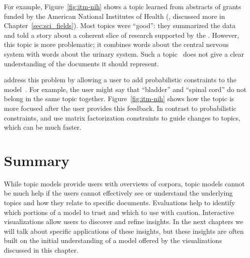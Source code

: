 For example, Figure~\ref{fig:itm-nih} shows a topic learned from abstracts of
grants funded by the American National Institutes of Health
(, discussed more in Chapter~\ref{sec:sci_fields}).  Most
topics were ``good'': they summarized the data and told a story about
a coherent slice of research supported by the .  However,
this topic is more problematic; it combines words about the central
nervous system with words about the urinary system.  Such a topic~\citep{mimno-11} does not give a clear understanding of the
documents it should represent.

\citet{hu-14:itm} address this problem by allowing a user to add probabilistic
constraints to the model~\citep{boyd-graber-07,andrzejewski-09}.  For example,
the user might say that ``bladder'' and ``spinal cord'' do not belong in the same
topic together.  Figure~\ref{fig:itm-nih} shows how the topic is more focused after the
user provides this feedback.  In contrast to probabilistic constraints,
\citet{choo-13} and \citet{lund-17} use matrix factorization constraints to guide changes
to topics, which can be much faster.

\section{Summary}

While topic models provide users with overviews of corpora, topic models
cannot be much help if the users cannot effectively see or understand
the underlying topics and how they relate to specific documents.
Evaluations help to identify which portions of a model to trust and which to use with caution.
Interactive visualizations allow users to discover and
refine insights. In the next chapters we will talk about specific applications of
these insights, but these insights are often built on the initial understanding
of a model offered by the visualizations discussed in this chapter.
